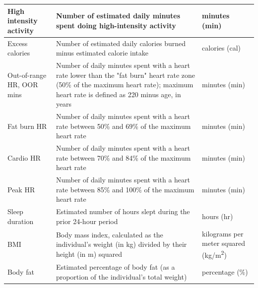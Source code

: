 \documentclass[10pt]{article}
\begin{document}
\begin{table}[]
{\begin{tabular}{p{1.5in}p{4in}p{1.5in}}
  \hline
High intensity activity & Number of estimated daily minutes spent doing high-intensity activity                                                                                                                & minutes (min)                            \\
  \hline
Excess calories         & Number of estimated daily calories burned minus estimated calorie intake                                                                                                             & calories (cal)                           \\
  \hline
Out-of-range HR, OOR mins         & Number of daily minutes spent with a heart rate lower than the "fat burn" heart rate zone (50\% of the maximum heart rate); maximum heart rate is defined as 220 minus age, in years & minutes (min)                            \\
  \hline
Fat burn HR             & Number of daily minutes spent with a heart rate between 50\% and 69\% of the maximum heart rate                                                                                      & minutes (min)                            \\
  \hline
Cardio HR               & Number of daily minutes spent with a heart rate between 70\% and 84\% of the maximum heart rate                                                                                      & minutes (min)                            \\
  \hline
Peak HR                 & Number of daily minutes spent with a heart rate between 85\% and 100\% of the maximum heart rate                                                                                     & minutes (min)                            \\
  \hline
Sleep duration          & Estimated number of hours slept during the prior 24-hour period                                                                                                                      & hours (hr)                               \\
  \hline
BMI                     & Body mass index, calculated as the
                          individual's weight (in kg) divided by their
                          height (in m) squared
  & kilograms per meter squared (kg/m\textsuperscript{2}) \\
  \hline
Body fat                & Estimated percentage of body fat (as a proportion of the individual's total weight)                                                                                                  & percentage (\%)                          \\

\end{tabular}}
\end{table}
\end{document}
